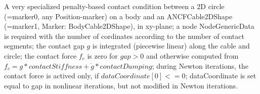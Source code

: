 \label{sec:item:ObjectContactCircleCable2D}
A very specialized penalty-based contact condition between a 2D circle (=marker0, any Position-marker) on a body and an ANCFCable2DShape (=marker1, Marker: BodyCable2DShape), in xy-plane; a node NodeGenericData is required with the number of cordinates according to the number of contact segments; the contact gap $g$ is integrated (piecewise linear) along the cable and circle; the contact force $f_c$ is zero for $gap>0$ and otherwise computed from $f_c = g*contactStiffness + \dot g*contactDamping$; during Newton iterations, the contact force is actived only, if $dataCoordinate[0] <= 0$; dataCoordinate is set equal to gap in nonlinear iterations, but not modified in Newton iterations.
\vspace{12pt}\\

